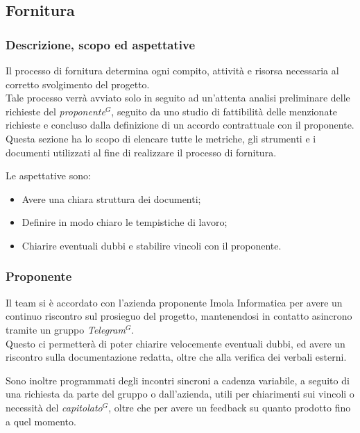 \subsection{Fornitura}

\subsubsection{Descrizione, scopo ed aspettative}

Il processo di fornitura determina ogni compito, attività e risorsa necessaria al corretto svolgimento del progetto. \\
Tale processo verrà avviato solo in seguito ad un’attenta analisi preliminare delle richieste del \emph{proponente}$^{G}$, seguito da uno studio di fattibilità delle menzionate
richieste e concluso dalla definizione di un accordo contrattuale con il proponente. \\

Questa sezione ha lo scopo di elencare tutte le metriche, gli strumenti e i documenti utilizzati al fine di realizzare il processo di fornitura.

Le aspettative sono:
\begin{itemize}
    \item Avere una chiara struttura dei documenti;
    \item Definire in modo chiaro le tempistiche di lavoro;
    \item Chiarire eventuali dubbi e stabilire vincoli con il proponente.
\end{itemize}
\subsubsection{Proponente}

Il team si è accordato con l'azienda proponente Imola Informatica per avere un continuo riscontro sul prosieguo del progetto, mantenendosi in contatto asincrono tramite un gruppo \emph{Telegram}$^{G}$. \\
Questo ci permetterà di poter chiarire velocemente eventuali dubbi, ed avere un riscontro sulla documentazione redatta, oltre che alla verifica dei verbali esterni.

Sono inoltre programmati degli incontri sincroni a cadenza variabile, a seguito di una richiesta da parte del gruppo o dall'azienda, utili per chiarimenti sui vincoli o necessità del \emph{capitolato}$^{G}$, oltre che per avere un feedback su quanto prodotto fino a quel momento.




